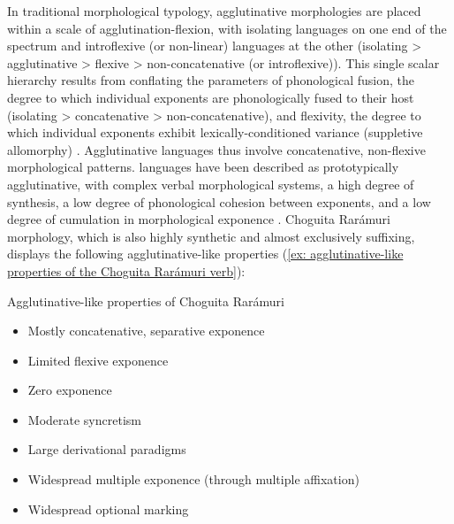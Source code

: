 In traditional morphological typology, agglutinative morphologies are placed within a scale of agglutination-flexion, with isolating languages on one end of the spectrum and introflexive (or non-linear) languages at the other (isolating > agglutinative > flexive > non-concatenative (or introflexive)). This single scalar hierarchy results from conflating the parameters of phonological fusion, the degree to which individual exponents are phonologically fused to their host (isolating > concatenative > non-concatenative), and flexivity, the degree to which individual exponents exhibit lexically-conditioned variance (suppletive allomorphy) \parencite{bickel2007inflectional}. Agglutinative languages thus involve concatenative, non-flexive morphological patterns.  languages have been described as prototypically agglutinative, with complex verbal morphological systems, a high degree of synthesis, a low degree of phonological cohesion between exponents, and a low degree of cumulation in morphological exponence \citep[see e.g.,][158]{langacker1977uto}. Choguita Rarámuri morphology, which is also highly synthetic and almost exclusively suffixing, displays the following agglutinative-like properties (\ref{ex: agglutinative-like properties of the Choguita Rarámuri verb}):

\ea\label{ex: agglutinative-like properties of the Choguita Rarámuri verb}
{Agglutinative-like properties of Choguita Rarámuri}

\begin{itemize}
    \item Mostly concatenative, separative exponence \\
    \item Limited flexive exponence \\
    \item   Zero exponence \\
    \item   Moderate syncretism\\
    \item   Large derivational paradigms \\
    \item    Widespread multiple exponence (through multiple affixation)\\
    \item   Widespread optional marking \\
\end{itemize}

